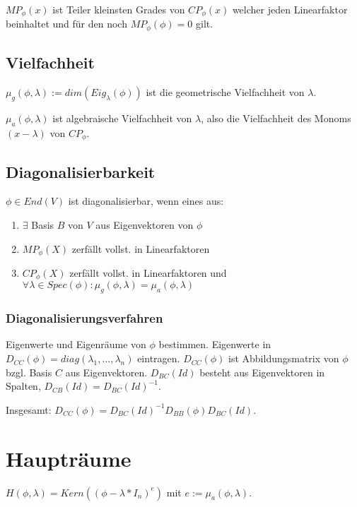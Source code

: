 $MP_\phi(x)$ ist Teiler kleinsten Grades von $CP_\phi(x)$ welcher jeden Linearfaktor beinhaltet und für den noch $MP_\phi(\phi) = 0$ gilt.

\subsection*{Vielfachheit}

$\mu_g(\phi, \lambda) := dim(Eig_\lambda(\phi))$ ist die geometrische Vielfachheit von $\lambda$.

$\mu_a(\phi, \lambda)$ ist algebraische Vielfachheit von $\lambda$, also die Vielfachheit des Monoms $(x-\lambda)$ von $CP_\phi$.

\subsection*{Diagonalisierbarkeit}

$\phi \in End(V)$ ist diagonalisierbar, wenn eines aus:

\begin{enumerate}[label=(\alph*)]
	\item $\exists$ Basis $B$ von $V$ aus Eigenvektoren von $\phi$
	\item $MP_\phi(X)$ zerfällt vollst. in Linearfaktoren
	\item $CP_\phi(X)$ zerfällt vollst. in Linearfaktoren und $\forall \lambda \in Spec(\phi) : \mu_g(\phi,\lambda) = \mu_a(\phi, \lambda)$
\end{enumerate}

\subsubsection*{Diagonalisierungsverfahren}

Eigenwerte und Eigenräume von $\phi$ bestimmen. Eigenwerte in $D_{CC}(\phi) = diag(\lambda_1, \hdots, \lambda_n)$ eintragen. $D_{CC}(\phi)$ ist Abbildungsmatrix von $\phi$ bzgl. Basis $C$ aus Eigenvektoren. $D_{BC}(Id)$ besteht aus Eigenvektoren in Spalten, $D_{CB}(Id) = D_{BC}(Id)^{-1}$.

Insgesamt: $D_{CC}(\phi) = D_{BC}(Id)^{-1} D_{BB}(\phi) D_{BC}(Id)$.

\section*{Haupträume}

$H(\phi, \lambda) = Kern((\phi - \lambda * I_n)^e)$ mit $e := \mu_a(\phi, \lambda)$.

